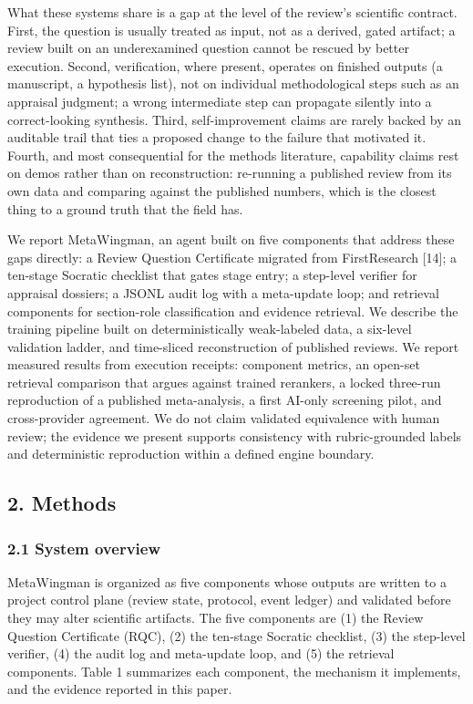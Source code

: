 \documentclass[
]{article}
\begin{document}
What these systems share is a gap at the level of the review's
scientific contract. First, the question is usually treated as input,
not as a derived, gated artifact; a review built on an underexamined
question cannot be rescued by better execution. Second, verification,
where present, operates on finished outputs (a manuscript, a hypothesis
list), not on individual methodological steps such as an appraisal
judgment; a wrong intermediate step can propagate silently into a
correct-looking synthesis. Third, self-improvement claims are rarely
backed by an auditable trail that ties a proposed change to the failure
that motivated it. Fourth, and most consequential for the methods
literature, capability claims rest on demos rather than on
reconstruction: re-running a published review from its own data and
comparing against the published numbers, which is the closest thing to a
ground truth that the field has.

We report MetaWingman, an agent built on five components that address
these gaps directly: a Review Question Certificate migrated from
FirstResearch {[}14{]}; a ten-stage Socratic checklist that gates stage
entry; a step-level verifier for appraisal dossiers; a JSONL audit log
with a meta-update loop; and retrieval components for section-role
classification and evidence retrieval. We describe the training pipeline
built on deterministically weak-labeled data, a six-level validation
ladder, and time-sliced reconstruction of published reviews. We report
measured results from execution receipts: component metrics, an open-set
retrieval comparison that argues against trained rerankers, a locked
three-run reproduction of a published meta-analysis, a first AI-only
screening pilot, and cross-provider agreement. We do not claim validated
equivalence with human review; the evidence we present supports
consistency with rubric-grounded labels and deterministic reproduction
within a defined engine boundary.

\subsection{2. Methods}\label{methods}

\subsubsection{2.1 System overview}\label{system-overview}

MetaWingman is organized as five components whose outputs are written to
a project control plane (review state, protocol, event ledger) and
validated before they may alter scientific artifacts. The five
components are (1) the Review Question Certificate (RQC), (2) the
ten-stage Socratic checklist, (3) the step-level verifier, (4) the audit
log and meta-update loop, and (5) the retrieval components. Table 1
summarizes each component, the mechanism it implements, and the evidence
reported in this paper.
\end{document}
